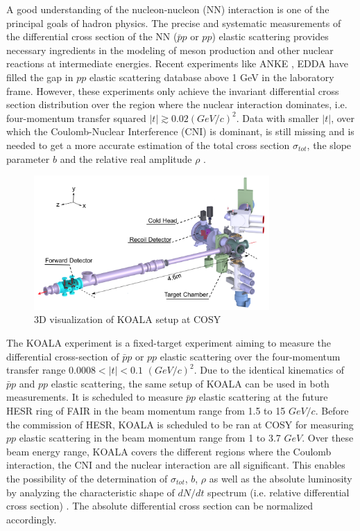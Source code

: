 \documentclass[number,5p]{elsarticle}
\begin{document}
A good understanding of the nucleon-nucleon (NN) interaction is one of the principal goals of hadron physics.
The precise and systematic measurements of the differential cross section of the
NN ($\bar{p}p$ or $pp$) elastic scattering provides necessary ingredients
in the modeling of meson production and other nuclear reactions at intermediate energies.
Recent experiments like ANKE \cite{ANKE}, EDDA \cite{EDDA} have filled the gap
in $pp$ elastic scattering database above 1 GeV in the laboratory frame.
However, these experiments only achieve the invariant differential cross section distribution over the region where the nuclear interaction dominates, 
i.e. four-momentum transfer squared \(|t| \gtrsim 0.02 (GeV/c)^2\).
Data with smaller \(|t|\), over which the Coulomb-Nuclear Interference (CNI) is
dominant, is still missing and is needed to get a more accurate estimation of
the total cross section \({\sigma}_{tot}\), the slope parameter \(b\) and the
relative real amplitude \(\rho\) \cite{RevModPhys.57.563}.

\begin{figure}[htbp]
	\centering
	\includegraphics[width=0.8\textwidth]{./koala_setup.png}
	\caption{3D visualization of KOALA setup at COSY}
	\label{fig:setup}
\end{figure}

The KOALA experiment is a fixed-target experiment aiming to measure the
differential cross-section of $\bar{p}p$ or $pp$ elastic scattering
over the four-momentum transfer range \(0.0008 < |t| < 0.1\) \((GeV/c)^2\).
Due to the identical kinematics of $\bar{p}p$ and $pp$ elastic scattering, the
same setup of KOALA can be used in both measurements.
It is scheduled to measure $\bar{p}p$ elastic
scattering at the future HESR ring of FAIR \cite{FAIR} in the beam momentum range from
1.5 to 15 $GeV/c$.
Before the commission of HESR, KOALA is scheduled to be ran at COSY \cite{COSY}
for measuring $pp$ elastic scattering in the beam momentum range from 1 to 3.7 $GeV$.
Over these beam energy range, KOALA covers the different regions where the Coulomb interaction, the CNI and the nuclear interaction are all significant.
This enables the possibility of the determination of \({\sigma}_{tot}\), \(b\), \(\rho\) as well as
the absolute luminosity by analyzing the characteristic shape of $dN/dt$
spectrum (i.e. relative differential cross section) \cite{bernard1987real,
  jenni2008atlas, recoil_article}.
The absolute differential cross section can be normalized accordingly.
\end{document}
